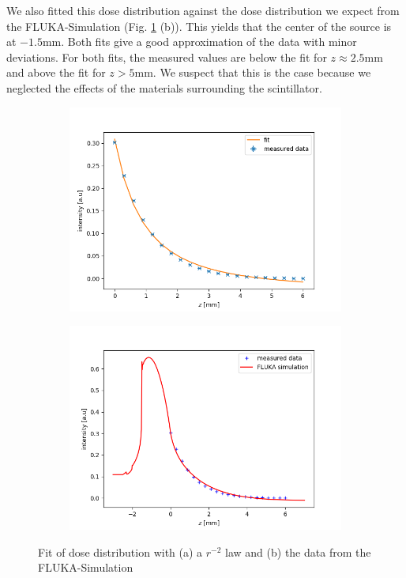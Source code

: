 \documentclass[a4paper,parskip]{scrartcl}
\begin{document}
We also fitted this dose distribution against the dose distribution we expect from the FLUKA-Simulation (Fig. \ref{radial_fits} (b)). This yields that the center of the source is at $-1.5 \mathrm{mm}$. Both fits give a good approximation of the data with minor deviations. For both fits, the measured values are below the fit for $z \approx 2.5 \mathrm{mm}$ and above the fit for $z > 5 \mathrm{mm}$. We suspect that this is the case because we neglected the effects of the materials surrounding the scintillator. 

 \begin{figure}
 \centering
 \begin{subfigure}{0.7\linewidth}
 \includegraphics[width =\linewidth]{Fit_invers_quadratisch.png}
 \caption{}
 \end{subfigure}
  \begin{subfigure}{0.7\linewidth}
 \includegraphics[width =\linewidth]{experiment_simulation_fit.png}
 \caption{}
 \end{subfigure}
 \caption{Fit of dose distribution with (a) a $r ^{-2}$ law and (b) the data from the FLUKA-Simulation}
 \label{radial_fits}
 \end{figure}
\end{document}
